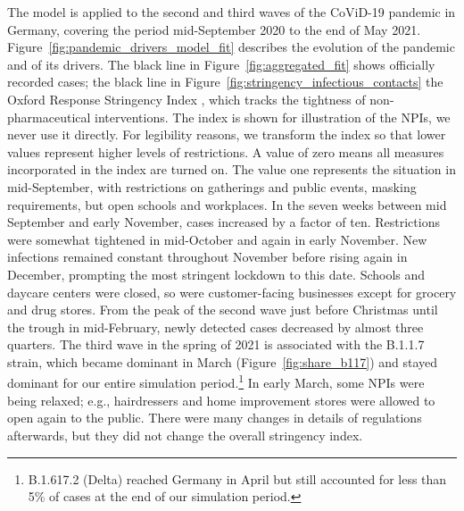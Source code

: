 The model is applied to the second and third waves of the CoViD-19 pandemic in Germany,
covering the period mid-September 2020 to the end of May 2021.
Figure~\ref{fig:pandemic_drivers_model_fit} describes the evolution of the pandemic and
of its drivers. The black line in Figure~\ref{fig:aggregated_fit} shows officially
recorded cases; the black line in Figure~\ref{fig:stringency_infectious_contacts} the
Oxford Response Stringency Index \citep{Hale2020}, which tracks the tightness of
non-pharmaceutical interventions. The index is shown for illustration of the NPIs, we
never use it directly. For legibility reasons, we transform the index so that lower
values represent higher levels of restrictions. A value of zero means all measures
incorporated in the index are turned on. The value one represents the situation in
mid-September, with restrictions on gatherings and public events, masking requirements,
but open schools and workplaces. In the seven weeks between mid September and early
November, cases increased by a factor of ten. Restrictions were somewhat tightened in
mid-October and again in early November. New infections remained constant throughout
November before rising again in December, prompting the most stringent lockdown to this
date. Schools and daycare centers were closed, so were customer-facing businesses except
for grocery and drug stores. From the peak of the second wave just before Christmas until
the trough in mid-February, newly detected cases decreased by almost three quarters. The
third wave in the spring of 2021 is associated with the B.1.1.7 strain, which became
dominant in March (Figure~\ref{fig:share_b117}) and stayed dominant for our entire
simulation period.\footnote{B.1.617.2 (Delta) reached Germany in April but still
accounted for less than 5\% of cases at the end of our simulation period.}
In early March, some NPIs were being relaxed; e.g., hairdressers and home improvement
stores were allowed to open again to the public. There were many changes in details of
regulations afterwards, but they did not change the overall stringency index.

